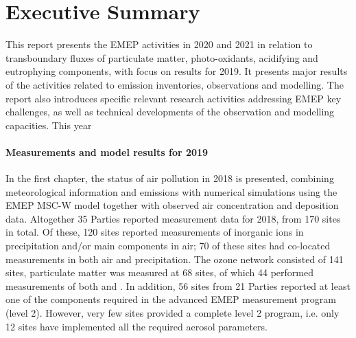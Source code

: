 \chapter*{Executive Summary}


This report presents the EMEP activities in 2020 and 2021 in relation to transboundary
fluxes of particulate matter, photo-oxidants, acidifying and
eutrophying components, with focus on results
for 2019. It presents major results of the activities related to
emission inventories, observations and modelling. The report also
introduces specific relevant research activities addressing EMEP key
challenges, as well as technical developments of the observation and
modelling capacities. This year 

\subsubsection*{Measurements and model results for 2019} %
In the first chapter, the status of air pollution in 2018 is presented, combining 
meteorological information and emissions with numerical simulations using the EMEP MSC-W model together with observed air concentration and deposition data.
Altogether 35 Parties reported measurement data for 2018, from 170 sites in total. 
Of these, 120 sites reported measurements of inorganic ions in precipitation and/or 
main components in air; 70 of these sites had co-located measurements in both air and 
precipitation. The ozone network consisted of 141 sites, particulate matter was measured at 
68 sites, of which 44 performed measurements of both \PM[10] and \PM[2.5]. 
In addition, 56 sites from 21 Parties reported at least one of the components required in the advanced EMEP measurement program (level 2). However, very few sites provided a complete level 2 program, i.e. only 12 sites have implemented all the required aerosol parameters. 

